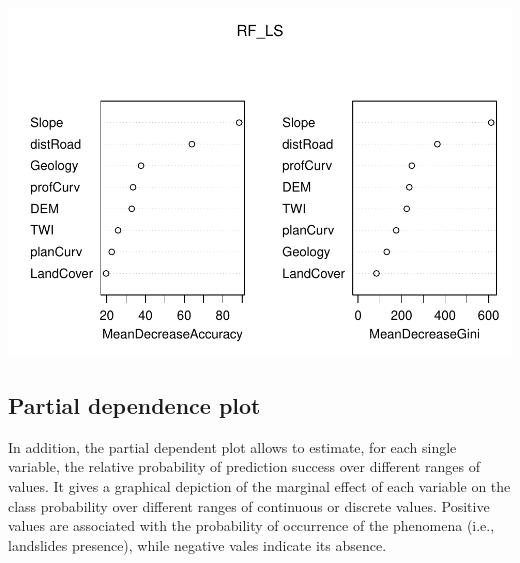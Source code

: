 \documentclass[
]{book}
\newenvironment{Shaded}{\begin{snugshade}}{\end{snugshade}}
\newcommand{\AttributeTok}[1]{\textcolor[rgb]{0.13,0.29,0.53}{#1}}
\newcommand{\CommentTok}[1]{\textcolor[rgb]{0.56,0.35,0.01}{\textit{#1}}}
\newcommand{\ConstantTok}[1]{\textcolor[rgb]{0.56,0.35,0.01}{#1}}
\newcommand{\DecValTok}[1]{\textcolor[rgb]{0.00,0.00,0.81}{#1}}
\newcommand{\FunctionTok}[1]{\textcolor[rgb]{0.13,0.29,0.53}{\textbf{#1}}}
\newcommand{\NormalTok}[1]{#1}
\newcommand{\SpecialCharTok}[1]{\textcolor[rgb]{0.81,0.36,0.00}{\textbf{#1}}}
\newcommand{\StringTok}[1]{\textcolor[rgb]{0.31,0.60,0.02}{#1}}
\begin{document}
\includegraphics{06-RF_files/figure-latex/var-imp-1.pdf}

\hypertarget{partial-dependence-plot}{%
\subsection{Partial dependence plot}\label{partial-dependence-plot}}

In addition, the partial dependent plot allows to estimate, for each single variable, the relative probability of prediction success over different ranges of values.
It gives a graphical depiction of the marginal effect of each variable on the class probability over different ranges of continuous or discrete values.
Positive values are associated with the probability of occurrence of the phenomena (i.e., landslides presence), while negative vales indicate its absence.

\begin{Shaded}
\end{Shaded}
\end{document}
